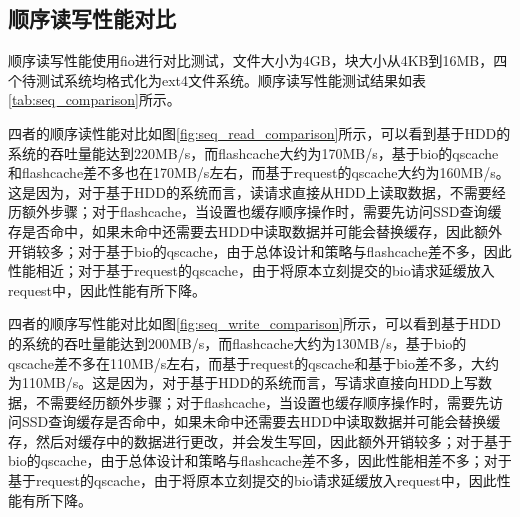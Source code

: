 \subsection{顺序读写性能对比}

顺序读写性能使用fio进行对比测试，文件大小为4GB，块大小从4KB到16MB，四个待测试系统均格式化为ext4文件系统。顺序读写性能测试结果如表\ref{tab:seq_comparison}所示。

四者的顺序读性能对比如图\ref{fig:seq_read_comparison}所示，可以看到基于HDD的系统的吞吐量能达到220MB/s，而flashcache大约为170MB/s，基于bio的qscache和flashcache差不多也在170MB/s左右，而基于request的qscache大约为160MB/s。这是因为，对于基于HDD的系统而言，读请求直接从HDD上读取数据，不需要经历额外步骤；对于flashcache，当设置也缓存顺序操作时，需要先访问SSD查询缓存是否命中，如果未命中还需要去HDD中读取数据并可能会替换缓存，因此额外开销较多；对于基于bio的qscache，由于总体设计和策略与flashcache差不多，因此性能相近；对于基于request的qscache，由于将原本立刻提交的bio请求延缓放入request中，因此性能有所下降。

四者的顺序写性能对比如图\ref{fig:seq_write_comparison}所示，可以看到基于HDD的系统的吞吐量能达到200MB/s，而flashcache大约为130MB/s，基于bio的qscache差不多在110MB/s左右，而基于request的qscache和基于bio差不多，大约为110MB/s。这是因为，对于基于HDD的系统而言，写请求直接向HDD上写数据，不需要经历额外步骤；对于flashcache，当设置也缓存顺序操作时，需要先访问SSD查询缓存是否命中，如果未命中还需要去HDD中读取数据并可能会替换缓存，然后对缓存中的数据进行更改，并会发生写回，因此额外开销较多；对于基于bio的qscache，由于总体设计和策略与flashcache差不多，因此性能相差不多；对于基于request的qscache，由于将原本立刻提交的bio请求延缓放入request中，因此性能有所下降。

